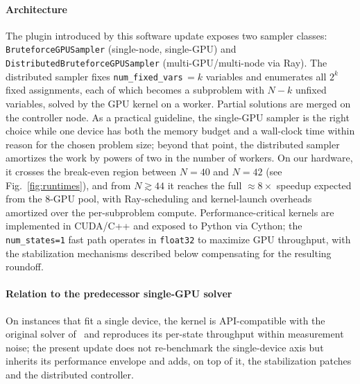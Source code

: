 \documentclass[preprint,12pt,a4paper]{elsarticle}
\begin{document}
\paragraph{Architecture}
The plugin introduced by this software update exposes two sampler classes:
\texttt{BruteforceGPUSampler} (single-node, single-GPU) and
\texttt{DistributedBruteforceGPUSampler} (multi-GPU/multi-node via Ray). The
distributed sampler fixes \texttt{num\_fixed\_vars}\,$=k$ variables and
enumerates all $2^{k}$ fixed assignments, each of which becomes a subproblem
with $N-k$ unfixed variables, solved by the GPU kernel on a worker. Partial
solutions are merged on the controller node. As a practical guideline, the
single-GPU sampler is the right choice while one device has both the memory
budget and a wall-clock time within reason for the chosen problem size;
beyond that point, the distributed sampler amortizes the work by powers of
two in the number of workers. On our hardware, it crosses the break-even
region between $N=40$ and $N=42$ (see Fig.~\ref{fig:runtimes}), and from
$N\!\gtrsim\!44$ it reaches the full $\approx\!8\times$ speedup expected
from the 8-GPU pool, with Ray-scheduling and kernel-launch overheads
amortized over the per-subproblem compute. Performance-critical
kernels are implemented in CUDA/C++ and exposed to Python via Cython; the
\texttt{num\_states=1} fast path operates in \texttt{float32} to maximize GPU
throughput, with the stabilization mechanisms described below compensating
for the resulting roundoff.

\paragraph{Relation to the predecessor single-GPU solver}
On instances that fit a single device, the kernel is API-compatible with
the original solver of~\cite{jalowiecki2021brute} and reproduces its
per-state throughput within measurement noise; the present update does not
re-benchmark the single-device axis but inherits its performance envelope
and adds, on top of it, the stabilization patches and the distributed
controller.
\end{document}
